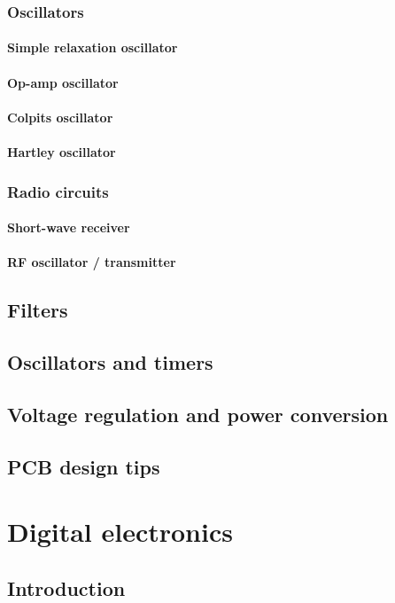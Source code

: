 \documentclass{report}
\begin{document}
\section{Oscillators}
\subsection{Simple relaxation oscillator}
\subsection{Op-amp oscillator}
\subsection{Colpits oscillator}
\subsection{Hartley oscillator}
\section{Radio circuits}
\subsection{Short-wave receiver}
\subsection{RF oscillator / transmitter}

\chapter{Filters}
\chapter{Oscillators and timers}
\chapter{Voltage regulation and power conversion}
\chapter{PCB design tips}

\part{Digital electronics}
\chapter{Introduction}
\end{document}
